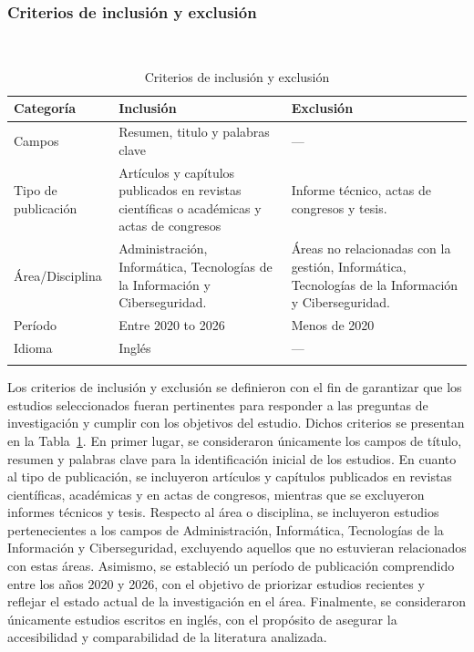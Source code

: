 \subsubsection{Criterios de inclusión y exclusión}
\mbox{}\\
\begin{table}[!t]
    \centering
    \renewcommand{\arraystretch}{1.0}
    \begin{tabularx}{\textwidth}{>{\centering\arraybackslash}m{} >{\raggedright\arraybackslash}X >{\raggedright\arraybackslash}X}
    \toprule
    \textbf{Categoría} & \textbf{Inclusión} & \textbf{Exclusión} \\
    \midrule
    Campos & Resumen, titulo y palabras clave & --- \\
    \midrule
    Tipo de publicación & Artículos y capítulos publicados en revistas científicas o académicas y actas de congresos & Informe técnico, actas de congresos y tesis. \\
    \midrule
    Área/Disciplina & Administración, Informática, Tecnologías de la Información y Ciberseguridad. & Áreas no relacionadas con la gestión, Informática, Tecnologías de la Información y Ciberseguridad. \\
    \midrule
    Período & Entre 2020 to 2026 & Menos de 2020 \\
    \midrule
    Idioma & Inglés & --- \\
    \bottomrule
    \vspace{1pt}
    \end{tabularx}
    \caption{Criterios de inclusión y exclusión}\label{tab:criterios}
\end{table}
Los criterios de inclusión y exclusión se definieron con el fin de garantizar que los estudios seleccionados fueran pertinentes para 
responder a las preguntas de investigación y cumplir con los objetivos del estudio. Dichos criterios se presentan en la Tabla~\ref{tab:criterios}.
En primer lugar, se consideraron únicamente los campos de título, resumen y palabras clave para la identificación inicial de los estudios. 
En cuanto al tipo de publicación, se incluyeron artículos y capítulos publicados en revistas científicas, académicas y en actas de 
congresos, mientras que se excluyeron informes técnicos y tesis. Respecto al área o disciplina, se incluyeron estudios pertenecientes a 
los campos de Administración, Informática, Tecnologías de la Información y Ciberseguridad, excluyendo aquellos que no estuvieran 
relacionados con estas áreas. Asimismo, se estableció un período de publicación comprendido entre los años 2020 y 2026, con el objetivo de 
priorizar estudios recientes y reflejar el estado actual de la investigación en el área. Finalmente, se consideraron únicamente estudios 
escritos en inglés, con el propósito de asegurar la accesibilidad y comparabilidad de la literatura analizada.

